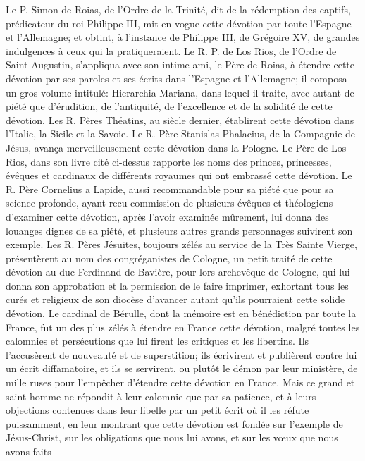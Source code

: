  Le P. Simon de Roias, de l'Ordre de la Trinité, dit de la rédemption des captifs, prédicateur du roi Philippe III,
mit en vogue cette dévotion par toute l'Espagne et l'Allemagne; et obtint, à l'instance de Philippe III, de Grégoire
XV, de grandes indulgences à ceux qui la pratiqueraient.
Le R. P. de Los Rios, de l'Ordre de Saint Augustin, s'appliqua avec son intime ami, le Père de Roias, à étendre
cette dévotion par ses paroles et ses écrits dans l'Espagne et l'Allemagne; il composa un gros volume intitulé:
Hierarchia Mariana, dans lequel il traite, avec autant de piété que d'érudition, de l'antiquité, de l'excellence et de la
solidité de cette dévotion. Les R. Pères Théatins, au siècle dernier, établirent cette dévotion dans l'Italie, la Sicile et
la Savoie.
 Le R. Père Stanislas Phalacius, de la Compagnie de Jésus, avança merveilleusement cette dévotion dans la
Pologne.
Le Père de Los Rios, dans son livre cité ci-dessus rapporte les noms des princes, princesses, évêques et
cardinaux de différents royaumes qui ont embrassé cette dévotion. Le R. Père Cornelius a Lapide, aussi
recommandable pour sa piété que pour sa science profonde, ayant recu commission de plusieurs évêques et
théologiens d'examiner cette dévotion, après l'avoir examinée mûrement, lui donna des louanges dignes de sa
piété, et plusieurs autres grands personnages suivirent son exemple. Les R. Pères Jésuites, toujours zélés au
service de la Très Sainte Vierge, présentèrent au nom des congréganistes de Cologne, un petit traité de cette
dévotion au duc Ferdinand de Bavière, pour lors archevêque de Cologne, qui lui donna son approbation et la
permission de le faire imprimer, exhortant tous les curés et religieux de son diocèse d'avancer autant qu'ils
pourraient cette solide dévotion.
 Le cardinal de Bérulle, dont la mémoire est en bénédiction par toute la France, fut un des plus zélés à
étendre en France cette dévotion, malgré toutes les calomnies et persécutions que lui firent les critiques et les
libertins. Ils l'accusèrent de nouveauté et de superstition; ils écrivirent et publièrent contre lui un écrit diffamatoire,
et ils se servirent, ou plutôt le démon par leur ministère, de mille ruses pour l'empêcher d'étendre cette dévotion en
France. Mais ce grand et saint homme ne répondit à leur calomnie que par sa patience, et à leurs objections
contenues dans leur libelle par un petit écrit où il les réfute puissamment, en leur montrant que cette dévotion est
fondée sur l'exemple de Jésus-Christ, sur les obligations que nous lui avons, et sur les vœux que nous avons faits
